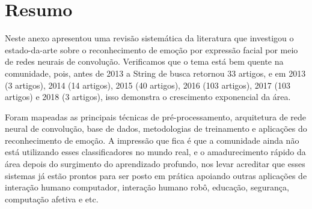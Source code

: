 \section{Resumo}\label{sec:consfi}
Neste anexo apresentou uma revisão sistemática da literatura que investigou o estado-da-arte sobre o reconhecimento de emoção por expressão facial por meio de redes neurais de convolução. Verificamos que o tema está bem quente na comunidade, pois, antes de 2013 a String de busca retornou 33 artigos, e em 2013 (3 artigos), 2014 (14 artigos), 2015 (40 artigos), 2016 (103 artigos), 2017 (103 artigos) e 2018 (3 artigos), isso demonstra o crescimento exponencial da área.

Foram mapeadas as principais técnicas de pré-processamento, arquitetura de rede neural de convolução, base de dados, metodologias de treinamento e aplicações do reconhecimento de emoção. A impressão que fica é que a comunidade ainda não está utilizando esses classificadores no mundo real, e o amadurecimento rápido da área depois do surgimento do aprendizado profundo, nos levar acreditar que esses sistemas já estão prontos para ser posto em prática apoiando outras aplicações de interação humano computador, interação humano robô, educação, segurança, computação afetiva e etc.
